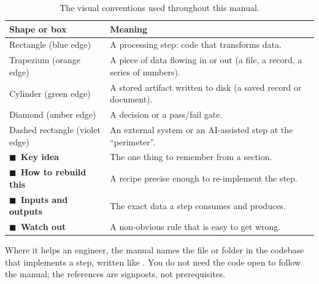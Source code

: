 \begin{table}[H]
\centering
\caption{The visual conventions used throughout this manual.}
\label{tab:conventions}
\small\sffamily
\begin{tabularx}{\textwidth}{@{}l L@{}}
\toprule
\textbf{Shape or box} & \textbf{Meaning} \\
\midrule
Rectangle (blue edge) & A processing step: code that transforms data. \\
Trapezium (orange edge) & A piece of data flowing in or out (a file, a record, a series of numbers). \\
Cylinder (green edge) & A stored artifact written to disk (a saved record or document). \\
Diamond (amber edge) & A decision or a pass/fail gate. \\
Dashed rectangle (violet edge) & An external system or an AI-assisted step at the ``perimeter''. \\
\addlinespace
\textcolor{gridqOrange}{$\blacksquare$}~\textbf{Key idea} & The one thing to remember from a section. \\
\textcolor{gridqBlue}{$\blacksquare$}~\textbf{How to rebuild this} & A recipe precise enough to re-implement the step. \\
\textcolor{gridqGreen}{$\blacksquare$}~\textbf{Inputs and outputs} & The exact data a step consumes and produces. \\
\textcolor{gridqViolet}{$\blacksquare$}~\textbf{Watch out} & A non-obvious rule that is easy to get wrong. \\
\bottomrule
\end{tabularx}
\end{table}

\begin{plainnote}
Where it helps an engineer, the manual names the file or folder in the codebase that implements a step, written like . You do not need the code open to follow the manual; the references are signposts, not prerequisites.
\end{plainnote}
